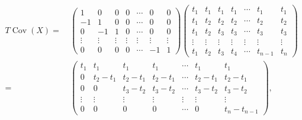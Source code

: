 \documentclass[10pt]{article}
\theoremstyle{boldnormal}
\theoremstyle{boldremark}
\begin{document}
{\footnotesize 
\begin{align*}
T\operatorname{Cov}(X) = & \  
\begin{pmatrix}
1 & 0 & 0 & 0 & \cdots & 0 & 0 
\\
-1 & 1 & 0 & 0 & \cdots & 0 & 0
\\
0 & -1 & 1 & 0 & \cdots & 0 & 0
\\
\vdots & \vdots & \vdots & \vdots & \vdots & \vdots & \vdots 
\\
0 & 0 & 0 & 0 & \cdots & -1 & 1
\end{pmatrix} 
\begin{pmatrix}
t_1 & t_1 & t_1 & t_1 & \cdots & t_1 & t_1 
\\
t_1 & t_2 & t_2 & t_2 & \cdots & t_2 & t_2
\\
t_1 & t_2 & t_3 & t_3 & \cdots & t_3 & t_3
\\
\vdots & \vdots & \vdots & \vdots & \vdots & \vdots & \vdots 
\\
t_1 & t_2 & t_3 & t_4 & \cdots & t_{n-1} & t_n
\end{pmatrix}
\\
= & \ 
\begin{pmatrix}
t_1 & t_1 & t_1 & t_1 & \cdots & t_1 & t_1  
\\
0 & t_2 - t_1 & t_2 - t_1 & t_2 - t_1  & \cdots & t_2 - t_1 & t_2 - t_1
\\
0 & 0  & t_3 - t_2 & t_3 - t_2 & \cdots & t_3 - t_2 & t_3 - t_2
\\
\vdots & \vdots & \vdots & \vdots & \vdots & \vdots & \vdots 
\\
0 & 0 & 0 & 0 & \cdots & 0 & t_n - t_{n-1}
\end{pmatrix},
\end{align*}
}
\end{document}
